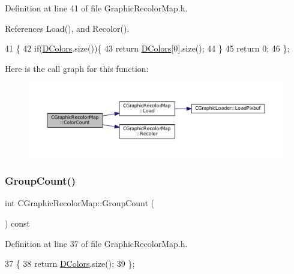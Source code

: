 Definition at line 41 of file Graphic\+Recolor\+Map.\+h.



References Load(), and Recolor().


\begin{DoxyCode}
41                               \{
42             \textcolor{keywordflow}{if}(\hyperlink{classCGraphicRecolorMap_a9dea9a9e96e4465a53a40c4a34cebf71}{DColors}.size())\{
43                 \textcolor{keywordflow}{return} \hyperlink{classCGraphicRecolorMap_a9dea9a9e96e4465a53a40c4a34cebf71}{DColors}[0].size();    
44             \}
45             \textcolor{keywordflow}{return} 0;
46         \};
\end{DoxyCode}
Here is the call graph for this function\+:\nopagebreak
\begin{figure}[H]
\begin{center}
\leavevmode
\includegraphics[width=350pt]{classCGraphicRecolorMap_a62215bd2082304dc710d0f63af9c9906_cgraph}
\end{center}
\end{figure}
\hypertarget{classCGraphicRecolorMap_a326b3f7b5ba379e2ccc07ffeb1eb69ca}{}\label{classCGraphicRecolorMap_a326b3f7b5ba379e2ccc07ffeb1eb69ca} 
\subsubsection{\texorpdfstring{Group\+Count()}{GroupCount()}}
{\footnotesize\ttfamily int C\+Graphic\+Recolor\+Map\+::\+Group\+Count (\begin{DoxyParamCaption}{ }\end{DoxyParamCaption}) const\hspace{0.3cm}{\ttfamily [inline]}}



Definition at line 37 of file Graphic\+Recolor\+Map.\+h.


\begin{DoxyCode}
37                               \{
38             \textcolor{keywordflow}{return} \hyperlink{classCGraphicRecolorMap_a9dea9a9e96e4465a53a40c4a34cebf71}{DColors}.size();
39         \};
\end{DoxyCode}
\hypertarget{classCGraphicRecolorMap_a71b26547c2e943036278611d048afdfb}{}\label{classCGraphicRecolorMap_a71b26547c2e943036278611d048afdfb} 
